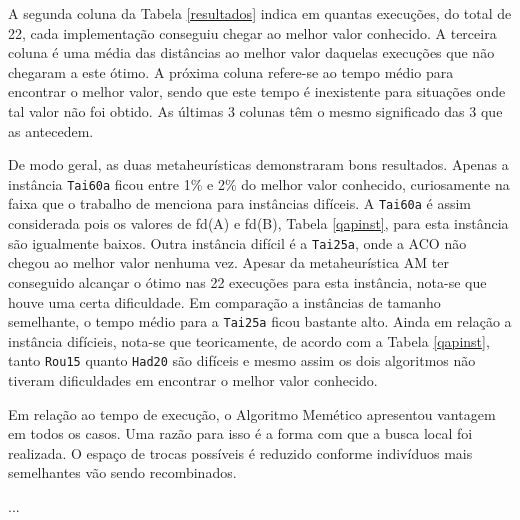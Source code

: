 A segunda coluna da Tabela \ref{resultados} indica em quantas
execuções, do total de 22, cada implementação conseguiu chegar ao
melhor valor conhecido. A terceira coluna é uma média das distâncias
ao melhor valor daquelas execuções que não chegaram a este ótimo. A
próxima coluna refere-se ao tempo médio para encontrar o melhor valor,
sendo que este tempo é inexistente para situações onde tal valor não
foi obtido. As últimas 3 colunas têm o mesmo significado das 3 que as
antecedem.

De modo geral, as duas metaheurísticas demonstraram bons
resultados. Apenas a instância \verb!Tai60a! ficou entre 1\% e 2\% do
melhor valor conhecido, curiosamente na faixa que o trabalho de
\cite{taillard1} menciona para instâncias difíceis. A \verb!Tai60a! é
assim considerada pois os valores de fd(A) e fd(B), Tabela
\ref{qapinst}, para esta instância são igualmente baixos.
Outra instância difícil é a \verb!Tai25a!, onde a ACO não chegou ao
melhor valor nenhuma vez. Apesar da metaheurística AM ter conseguido
alcançar o ótimo nas 22 execuções para esta instância, nota-se que
houve uma certa dificuldade. Em comparação a instâncias de tamanho
semelhante, o tempo médio para a \verb!Tai25a! ficou bastante alto.
Ainda em relação a instância difícieis, nota-se que teoricamente, de
acordo com a Tabela \ref{qapinst}, tanto \verb!Rou15! quanto
\verb!Had20! são difíceis e mesmo assim os dois algoritmos não tiveram
dificuldades em encontrar o melhor valor conhecido.

Em relação ao tempo de execução, o Algoritmo Memético apresentou
vantagem em todos os casos. Uma razão para isso é a forma com que a
busca local foi realizada. O espaço de trocas possíveis é reduzido
conforme indivíduos mais semelhantes vão sendo recombinados.

...
